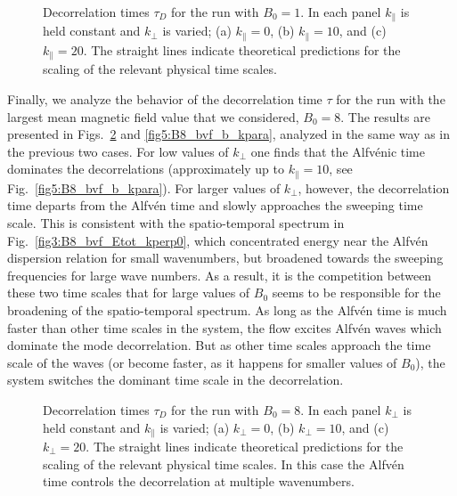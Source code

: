\documentclass[aip,pop,reprint,amsmath,amssymb,floatfix]{revtex4-1}
\begin{document}
\begin{figure}
  \centering


  \caption{Decorrelation times $\tau_D$ for the run with $B_0=1$. In each
    panel $k_\parallel$ is held constant and $k_\perp$ is varied; (a)
    $k_\parallel = 0$, (b) $k_\parallel = 10$, and (c) $k_\parallel =
    20$. The straight lines indicate theoretical predictions for
    the scaling of the relevant physical time scales.}
  \label{fig5:B1_bvf_b_kpara}
\end{figure}

Finally, we analyze the behavior of the decorrelation time $\tau$ for
the run with the largest mean magnetic field value that we
considered, $B_0=8$. The results are presented in 
Figs.~\ref{fig5:B8_bvf_b_kperp} and \ref{fig5:B8_bvf_b_kpara}, analyzed in
the same way as in the previous two cases.  For low values of $k_\perp$
one finds that the Alfv\'enic time dominates the decorrelations
(approximately up to $k_\parallel = 10$, see
Fig.~\ref{fig5:B8_bvf_b_kpara}). For larger values of $k_{\perp}$,
however, the decorrelation time departs from the Alfv\'en time and
slowly approaches the sweeping time scale. This is consistent with the
spatio-temporal spectrum in Fig.~\ref{fig3:B8_bvf_Etot_kperp0}, which
concentrated energy near the Alfv\'en dispersion relation for small
wavenumbers, but broadened towards the sweeping frequencies for large
wave numbers. As a result, it is the competition between these two
time scales that for large values of $B_0$ seems to be responsible for
the broadening of the spatio-temporal spectrum. As long as the
Alfv\'en time is much faster than other time scales in the system, the
flow excites Alfv\'en waves which dominate the mode decorrelation. But
as other time scales approach the time scale of the waves (or become
faster, as it happens for smaller values of $B_0$), the system
switches the dominant time scale in the decorrelation.

\begin{figure}
  \centering


  \caption{Decorrelation times $\tau_D$ for the run with $B_0=8$. In each
    panel $k_\perp$ is held constant and $k_\parallel$ is varied; (a)
    $k_\perp=0$, (b) $k_\perp = 10$, and (c) $k_\perp = 20$. The
    straight lines indicate theoretical predictions for
    the scaling of the relevant physical time scales. In this case the
    Alfv\'en time controls the decorrelation at multiple wavenumbers.}
  \label{fig5:B8_bvf_b_kperp}
\end{figure}
\end{document}
